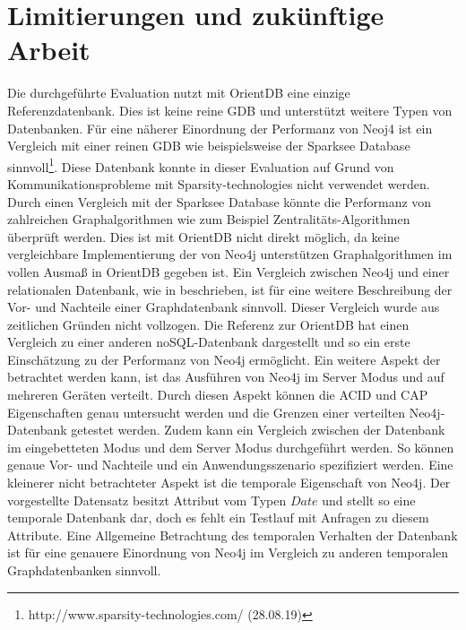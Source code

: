 \section{Limitierungen und zukünftige Arbeit}
Die durchgeführte Evaluation nutzt mit OrientDB  eine einzige Referenzdatenbank. Dies ist keine reine GDB und unterstützt weitere Typen von Datenbanken. Für eine näherer Einordnung der Performanz von Neoj4 ist ein Vergleich mit einer reinen GDB wie beispielsweise der Sparksee Database sinnvoll\footnote{http://www.sparsity-technologies.com/ (28.08.19)}. Diese Datenbank konnte in dieser Evaluation auf Grund von Kommunikationsprobleme mit Sparsity-technologies nicht verwendet werden. Durch einen Vergleich mit der Sparksee Database könnte die Performanz von zahlreichen Graphalgorithmen   wie zum Beispiel Zentralitäts-Algorithmen überprüft werden. Dies ist mit OrientDB nicht direkt möglich, da keine vergleichbare Implementierung der von Neo4j unterstützen Graphalgorithmen im vollen Ausmaß in OrientDB gegeben ist. \newline 
Ein Vergleich zwischen Neo4j und einer relationalen Datenbank, wie in \parencite{vicknair2010comparison} beschrieben, ist für eine weitere Beschreibung der Vor- und Nachteile einer Graphdatenbank sinnvoll. Dieser Vergleich wurde aus zeitlichen Gründen nicht vollzogen. Die Referenz zur OrientDB hat einen Vergleich zu einer anderen noSQL-Datenbank dargestellt und so ein erste Einschätzung zu der Performanz von Neo4j ermöglicht. \newline
Ein weitere Aspekt der betrachtet werden kann, ist das Ausführen von Neo4j im Server Modus und auf mehreren Geräten verteilt. Durch diesen Aspekt können die ACID und CAP Eigenschaften genau untersucht werden und die Grenzen einer verteilten Neo4j-Datenbank getestet werden. Zudem kann ein Vergleich zwischen der Datenbank im eingebetteten Modus und dem Server Modus durchgeführt werden. So können genaue Vor- und Nachteile und ein Anwendungsszenario spezifiziert werden. \newline
Eine kleinerer nicht betrachteter Aspekt ist die temporale Eigenschaft von Neo4j. Der vorgestellte Datensatz besitzt Attribut vom Typen $Date$ und stellt so eine temporale Datenbank dar, doch es fehlt ein Testlauf mit Anfragen zu diesem Attribute. Eine Allgemeine Betrachtung des temporalen Verhalten der Datenbank ist für eine genauere Einordnung von Neo4j im Vergleich zu anderen temporalen Graphdatenbanken sinnvoll. 
